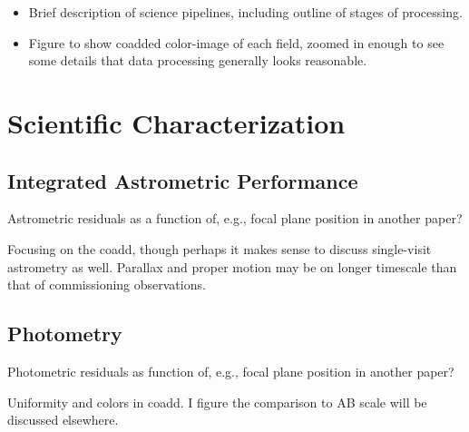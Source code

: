 

\begin{itemize}

\item Brief description of science pipelines, including outline of stages of processing.

\item Figure to show coadded color-image of each field, zoomed in enough to see some details that data processing generally looks reasonable.

\end{itemize}

\section{Scientific Characterization}

\subsection{Integrated Astrometric Performance}

Astrometric residuals as a function of, e.g., focal plane position in another paper?

Focusing on the coadd, though perhaps it makes sense to discuss single-visit astrometry as well.
Parallax and proper motion may be on longer timescale than that of commissioning observations.

\subsection{Photometry}

Photometric residuals as function of, e.g., focal plane position in another paper?

Uniformity and colors in coadd.
I figure the comparison to AB scale will be discussed elsewhere.

